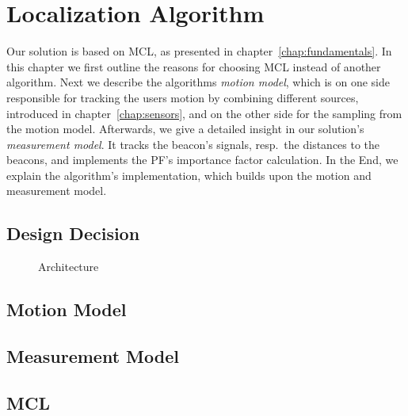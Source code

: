 \chapter{Localization Algorithm} \label{chap:pf}
Our solution is based on \acl{MCL}, as presented in chapter~\ref{chap:fundamentals}. In this chapter we first outline the reasons for choosing \acs{MCL} instead of another algorithm. Next we describe the algorithms \emph{motion model}, which is on one side responsible for tracking the users motion by combining different sources, introduced in chapter~\ref{chap:sensors}, and on the other side for the sampling from the motion model. Afterwards, we give a detailed insight in our solution's \emph{measurement model}. It tracks the beacon's signals, resp.\ the distances to the beacons, and implements the \acs{PF}'s importance factor calculation. In the End, we explain the algorithm's implementation, which builds upon the motion and measurement model.
\section{Design Decision}










\begin{figure}
\def\svgwidth{0.9\textwidth}

%
\caption{Architecture}	
\end{figure}



\section{Motion Model}

\section{Measurement Model}

\section{\acl{MCL}}
